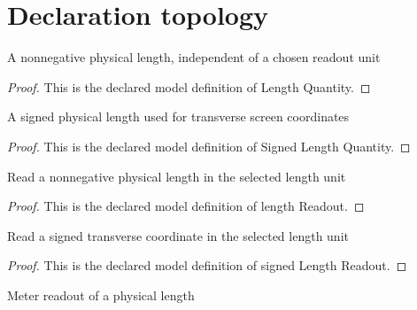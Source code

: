 \section{Declaration topology}
\begin{definition}
  \label{def:physics:phyx-mini-0248:phyxminiproblems-problemphyxmini0248-lengthquantity}
  A nonnegative physical length, independent of a chosen readout unit
\end{definition}
\begin{proof}
  This is the declared model definition of Length Quantity.
\end{proof}
\begin{definition}
  \label{def:physics:phyx-mini-0248:phyxminiproblems-problemphyxmini0248-signedlengthquantity}
  A signed physical length used for transverse screen coordinates
\end{definition}
\begin{proof}
  This is the declared model definition of Signed Length Quantity.
\end{proof}
\begin{definition}
  \label{def:physics:phyx-mini-0248:phyxminiproblems-problemphyxmini0248-lengthreadout}
  Read a nonnegative physical length in the selected length unit
\end{definition}
\begin{proof}
  This is the declared model definition of length Readout.
\end{proof}
\begin{definition}
  \label{def:physics:phyx-mini-0248:phyxminiproblems-problemphyxmini0248-signedlengthreadout}
  Read a signed transverse coordinate in the selected length unit
\end{definition}
\begin{proof}
  This is the declared model definition of signed Length Readout.
\end{proof}
\begin{definition}
  \label{def:physics:phyx-mini-0248:phyxminiproblems-problemphyxmini0248-lengthinmeters}
  Meter readout of a physical length
\end{definition}
